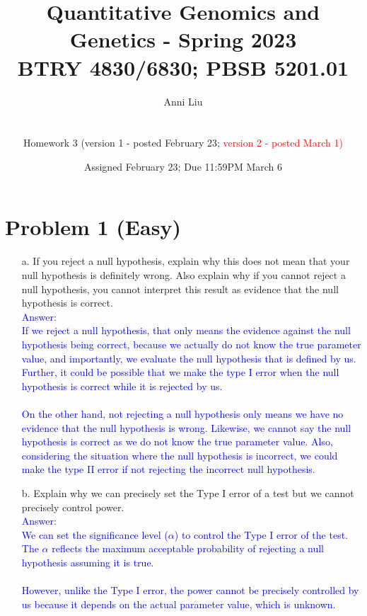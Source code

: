 \documentclass[letterpaper, 11pt]{article}
\title{Quantitative Genomics and Genetics - Spring 2023 \\
BTRY 4830/6830; PBSB 5201.01}
\author{Anni Liu \\ \\ \\ Homework 3 (version 1 - posted February 23;  \textcolor{red}{version 2 - posted March 1)}}
\date{Assigned February 23; Due 11:59PM March 6}                                           %
\begin{document}
\vspace{-20in}

\maketitle
\section*{Problem 1 (Easy)}

\begin{itemize}
\item[a.] If you reject a null hypothesis, explain why this does not mean that your null hypothesis is definitely wrong.  Also explain why if you cannot reject a null hypothesis, you cannot interpret this result as evidence that the null hypothesis is correct.\\

\textcolor{blue}{Answer:\\ 
If we reject a null hypothesis, that only means the evidence against the null hypothesis being correct, because we actually do not know the true parameter value, and importantly, we evaluate the null hypothesis that is defined by us. Further, it could be possible that we make the type I error when the null hypothesis is correct while it is rejected by us.\\\\
On the other hand, not rejecting a null hypothesis only means we have no evidence that the null hypothesis is wrong. Likewise, we cannot say the null hypothesis is correct as we do not know the true parameter value. Also, considering the situation where the null hypothesis is incorrect, we could make the type II error if not rejecting the incorrect null hypothesis.
}\\

\item[b.] Explain why we can precisely set the Type I error of a test but we cannot precisely control power.\\

\textcolor{blue}{Answer:\\ 
We can set the significance level ($\alpha$) to control the Type I error of the test. The $\alpha$ reflects the maximum acceptable probability of rejecting a null hypothesis assuming it is true. \\\\
However, unlike the Type I error, the power cannot be precisely controlled by us because it depends on the actual parameter value, which is unknown. 
}\\

\end{itemize}
\end{document}
